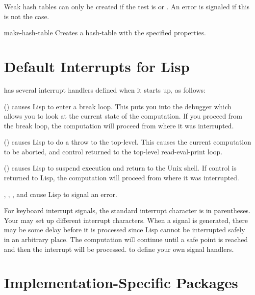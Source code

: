 Weak hash tables can only be created if the test is  or
.  An error is signaled if this is not the case.

\begin{defun}{}{make-hash-table}%
  {}
  Creates a hash-table with the specified properties.
\end{defun}
\section{Default Interrupts for Lisp}

\cmucl{} has several interrupt handlers defined when it starts up,
as follows:
\begin{Lentry}
  
\item[\code{SIGINT} (\ctrl{c})] causes Lisp to enter a break loop.
  This puts you into the debugger which allows you to look at the
  current state of the computation.  If you proceed from the break
  loop, the computation will proceed from where it was interrupted.
  
\item[\code{SIGQUIT} (\ctrl{L})] causes Lisp to do a throw to the
  top-level.  This causes the current computation to be aborted, and
  control returned to the top-level read-eval-print loop.
  
\item[\code{SIGTSTP} (\ctrl{z})] causes Lisp to suspend execution and
  return to the Unix shell.  If control is returned to Lisp, the
  computation will proceed from where it was interrupted.
  
\item[\code{SIGILL}, \code{SIGBUS}, \code{SIGSEGV}, and \code{SIGFPE}]
  cause Lisp to signal an error.
\end{Lentry}
For keyboard interrupt signals, the standard interrupt character is in
parentheses.  Your  may set up different interrupt
characters.  When a signal is generated, there may be some delay before
it is processed since Lisp cannot be interrupted safely in an arbitrary
place.  The computation will continue until a safe point is reached and
then the interrupt will be processed.   to define
your own signal handlers.


\section{Implementation-Specific Packages}

